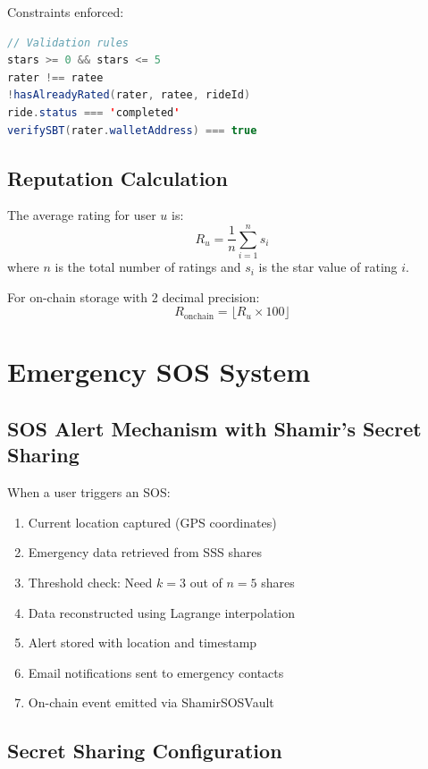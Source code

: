 \documentclass[12pt]{report}
\theoremstyle{plain}
\theoremstyle{definition}
\theoremstyle{remark}
\begin{document}
Constraints enforced:
\begin{lstlisting}[language=Java, caption=Rating Validation Rules]
// Validation rules
stars >= 0 && stars <= 5
rater !== ratee
!hasAlreadyRated(rater, ratee, rideId)
ride.status === 'completed'
verifySBT(rater.walletAddress) === true
\end{lstlisting}

\subsection{Reputation Calculation}

The average rating for user $u$ is:
\begin{equation}
R_u = \frac{1}{n} \sum_{i=1}^{n} s_i
\end{equation}
where $n$ is the total number of ratings and $s_i$ is the star value of rating $i$.

For on-chain storage with 2 decimal precision:
\begin{equation}
R_{\text{onchain}} = \lfloor R_u \times 100 \rfloor
\end{equation}

\section{Emergency SOS System}

\subsection{SOS Alert Mechanism with Shamir's Secret Sharing}

When a user triggers an SOS:

\begin{enumerate}
    \item Current location captured (GPS coordinates)
    \item Emergency data retrieved from SSS shares
    \item Threshold check: Need $k=3$ out of $n=5$ shares
    \item Data reconstructed using Lagrange interpolation
    \item Alert stored with location and timestamp
    \item Email notifications sent to emergency contacts
    \item On-chain event emitted via ShamirSOSVault
\end{enumerate}

\subsection{Secret Sharing Configuration}
\end{document}
